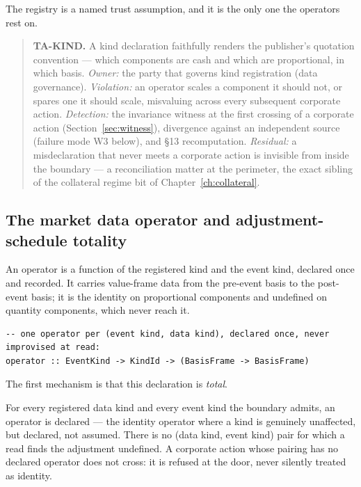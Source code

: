 The registry is a named trust assumption, and it is the only one the operators rest on.

\begin{quote}
\textbf{TA-KIND.} A kind declaration faithfully renders the publisher's quotation
convention --- which components are cash and which are proportional, in which basis.
\emph{Owner:} the party that governs kind registration (data governance). \emph{Violation:}
an operator scales a component it should not, or spares one it should scale, misvaluing
across every subsequent corporate action. \emph{Detection:} the invariance witness at the
first crossing of a corporate action (Section~\ref{sec:witness}), divergence against an
independent source (failure mode W3 below), and \S 13 recomputation. \emph{Residual:} a
misdeclaration that never meets a corporate action is invisible from inside the boundary
--- a reconciliation matter at the perimeter, the exact sibling of the collateral regime
bit of Chapter~\ref{ch:collateral}.
\end{quote}

\subsection{The market data operator and adjustment-schedule totality}\label{sec:operator}

An operator is a function of the registered kind and the event kind, declared once and
recorded. It carries value-frame data from the pre-event basis to the post-event basis;
it is the identity on proportional components and undefined on quantity components, which
never reach it.

\begin{lstlisting}
-- one operator per (event kind, data kind), declared once, never improvised at read:
operator :: EventKind -> KindId -> (BasisFrame -> BasisFrame)
\end{lstlisting}

The first mechanism is that this declaration is \emph{total}.

\begin{principle}\label{prin:sched-total}
For every registered data kind and every event kind the boundary admits, an operator is
declared --- the identity operator where a kind is genuinely unaffected, but declared, not
assumed. There is no (data kind, event kind) pair for which a read finds the adjustment
undefined. A corporate action whose pairing has no declared operator does not cross: it is
refused at the door, never silently treated as identity.
\end{principle}

